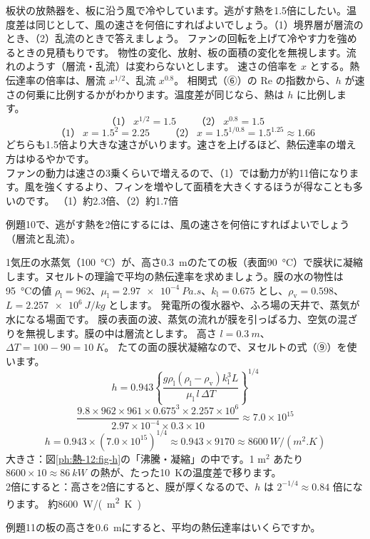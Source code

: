 \label{ph:熱-12:ex10}
\begin{phreidai}
板状の放熱器を、板に沿う風で冷やしています。逃がす熱を1.5倍にしたい。温度差は同じとして、風の速さを何倍にすればよいでしょう。（1）境界層が層流のとき、（2）乱流のときで答えましょう。
\phbamen
ファンの回転を上げて冷やす力を強めるときの見積もりです。
\phmushi
物性の変化、放射、板の面積の変化を無視します。流れのようす（層流・乱流）は変わらないとします。
\phzu
速さの倍率を $x$ とする。熱伝達率の倍率は、層流 $x^{1/2}$、乱流 $x^{0.8}$。
\phriyu
相関式（⑥）の Re の指数から、$h$ が速さの何乗に比例するかがわかります。温度差が同じなら、熱は $h$ に比例します。
\phtateru
\[（1）\ x^{1/2}=1.5\qquad（2）\ x^{0.8}=1.5\]
\phtoku
\[（1）\ x=1.5^2=2.25\qquad（2）\ x=1.5^{1/0.8}=1.5^{1.25}\approx1.66\]
\phtashikame
どちらも1.5倍より大きな速さがいります。速さを上げるほど、熱伝達率の増え方はゆるやかです。\\
ファンの動力は速さの3乗くらいで増えるので、（1）では動力が約11倍になります。風を強くするより、フィンを増やして面積を大きくするほうが得なことも多いのです。
\kotae （1）約2.3倍、（2）約1.7倍
\end{phreidai}
\begin{jibun}
例題10で、逃がす熱を2倍にするには、風の速さを何倍にすればよいでしょう（層流と乱流）。
\end{jibun}

\label{ph:熱-12:ex11}
\begin{phreidai}[たての冷たい板につく水の膜]
1気圧の水蒸気（\qty{100}{\celsius}）が、高さ\qty{0.3}{m}のたての板（表面\qty{90}{\celsius}）で膜状に凝縮します。ヌセルトの理論で平均の熱伝達率を求めましょう。膜の水の物性は\qty{95}{\celsius}の値 $\rho_{\mathrm l}=962$、$\mu_{\mathrm l}=\qty{2.97e-4}{Pa.s}$、$k_{\mathrm l}=0.675$ とし、$\rho_{\mathrm v}=0.598$、$L=\qty{2.257e6}{J/kg}$ とします。
\phbamen
発電所の復水器や、ふろ場の天井で、蒸気が水になる場面です。
\phmushi
膜の表面の波、蒸気の流れが膜を引っぱる力、空気の混ざりを無視します。膜の中は層流とします。
\phzu
高さ $l=\qty{0.3}{m}$、$\Delta T=100-90=\qty{10}{K}$。
\phriyu
たての面の膜状凝縮なので、ヌセルトの式（⑨）を使います。
\phtateru
\[h=0.943\left\{\frac{g\rho_{\mathrm l}(\rho_{\mathrm l}-\rho_{\mathrm v})k_{\mathrm l}^3L}{\mu_{\mathrm l}\,l\,\Delta T}\right\}^{1/4}\]
\phtoku
\[\frac{9.8\times962\times961\times0.675^3\times2.257\times10^6}{2.97\times10^{-4}\times0.3\times10}\approx7.0\times10^{15}\]
\[h=0.943\times(7.0\times10^{15})^{1/4}\approx0.943\times9170\approx\qty{8600}{W/(m^2.K)}\]
\phtashikame
大きさ：図\ref{ph:熱-12:fig-h}の「沸騰・凝縮」の中です。1 m$^2$ あたり $8600\times10\approx\qty{86}{kW}$ の熱が、たった\qty{10}{K}の温度差で移ります。\\
2倍にすると：高さを2倍にすると、膜が厚くなるので、$h$ は $2^{-1/4}\approx0.84$ 倍になります。
\kotae 約\qty{8600}{W/(m^2.K)}
\end{phreidai}
\begin{jibun}
例題11の板の高さを\qty{0.6}{m}にすると、平均の熱伝達率はいくらですか。
\end{jibun}

